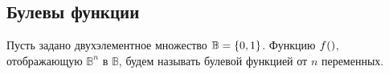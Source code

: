 \documentclass[letterpaper, 10pt]{article}
\theoremstyle{definition}
\begin{document}
\subsection{Булевы функции}
Пусть задано двухэлементное множество $\mathbb{B}=\left\{0,1\right\}$.
Функцию $f(\rseq x)$, отображающую $\mathbb{B}^n$ в $\mathbb{B}$, будем называть
булевой функцией от $n$ переменных.
\end{document}
